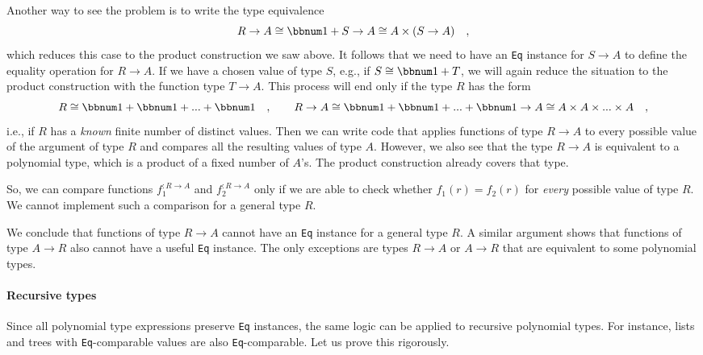 Another way to see the problem is to write the type equivalence
\[
R\rightarrow A\cong\bbnum 1+S\rightarrow A\cong A\times(S\rightarrow A)\quad,
\]
which reduces this case to the product construction we saw above.
It follows that we need to have an \lstinline!Eq! instance for $S\rightarrow A$
to define the equality operation for $R\rightarrow A$. If we have
a chosen value of type $S$, e.g., if $S\cong\bbnum 1+T$, we will
again reduce the situation to the product construction with the function
type $T\rightarrow A$. This process will end only if the type $R$
has the form 
\[
R\cong\bbnum 1+\bbnum 1+...+\bbnum 1\quad,\quad\quad R\rightarrow A\cong\bbnum 1+\bbnum 1+...+\bbnum 1\rightarrow A\cong A\times A\times...\times A\quad,
\]
i.e., if $R$ has a \emph{known} finite number of distinct values.
Then we can write code that applies functions of type $R\rightarrow A$
to every possible value of the argument of type $R$ and compares
all the resulting values of type $A$. However, we also see that the
type $R\rightarrow A$ is equivalent to a polynomial type, which is
a product of a fixed number of $A$\textsf{'}s. The product construction already
covers that type.

So, we can compare functions $f_{1}^{:R\rightarrow A}$ and $f_{2}^{:R\rightarrow A}$
only if we are able to check whether $f_{1}(r)=f_{2}(r)$ for \emph{every}
possible value of type $R$. We cannot implement such a comparison
for a general type $R$.

We conclude that functions of type $R\rightarrow A$ cannot have an
\lstinline!Eq! instance for a general type $R$. A similar argument
shows that functions of type $A\rightarrow R$ also cannot have a
useful \lstinline!Eq! instance. The only exceptions are types $R\rightarrow A$
or $A\rightarrow R$ that are equivalent to some polynomial types.

\paragraph{Recursive types}

Since all polynomial type expressions preserve \lstinline!Eq! instances,
the same logic can be applied to recursive polynomial types. For instance,
lists and trees with \lstinline!Eq!-comparable values are also \lstinline!Eq!-comparable.
Let us prove this rigorously.

